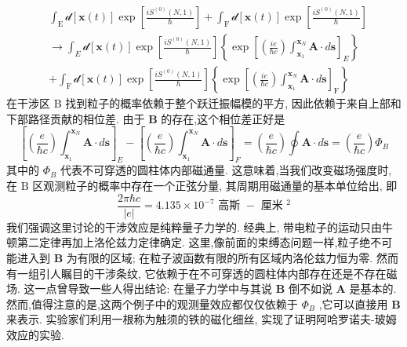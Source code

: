 \documentclass[lang=cn,newtx,10pt,scheme=chinese,thmcnt=section]{elegantbook}
\begin{document}
\begin{equation}
	\begin{aligned}
		&\int_{\mathrm{E}}\mathcal{d}\left\lbrack {\mathbf{x}\left( t\right) }\right\rbrack \exp \left\lbrack \frac{i{S}^{\left( 0\right) }\left( {N,1}\right) }{\hbar }\right\rbrack + \int_{\mathrm{F}}\mathcal{d}\left\lbrack {\mathbf{x}\left( t\right) }\right\rbrack \exp \left\lbrack \frac{i{S}^{\left( 0\right) }\left( {N,1}\right) }{\hbar }\right\rbrack\\
		&\rightarrow \int_{E}\mathcal{d}\left\lbrack {\mathbf{x}\left( t\right) }\right\rbrack \exp \left\lbrack \frac{i{S}^{\left( 0\right) }\left( {N,1}\right) }{\hbar }\right\rbrack \left\{ {\exp {\left\lbrack \left( \frac{ie}{\hbar c}\right) \int_{{\mathbf{x}}_{1}}^{{\mathbf{x}}_{N}}\mathbf{A} \cdot d\mathbf{s}\right\rbrack }_{E}}\right\}\\
		&+ \int_{\mathrm{F}}\mathcal{d}\left\lbrack {\mathbf{x}\left( t\right) }\right\rbrack \exp \left\lbrack \frac{i{S}^{\left( 0\right) }\left( {N,1}\right) }{\hbar }\right\rbrack \left\{ {\exp {\left\lbrack \left( \frac{ie}{\hbar c}\right) \int_{{\mathbf{x}}_{1}}^{{\mathbf{x}}_{N}}\mathbf{A} \cdot d\mathbf{s}\right\rbrack }_{\mathrm{F}}}\right\}
	\end{aligned}
\end{equation}
在干涉区 B 找到粒子的概率依赖于整个跃迁振幅模的平方, 因此依赖于来自上部和下部路径贡献的相位差. 由于 $\mathbf{B}$ 的存在,这个相位差正好是
\begin{equation}
	{\left\lbrack \left( \frac{e}{\hbar c}\right) \int_{{\mathbf{x}}_{1}}^{{\mathbf{x}}_{N}}\mathbf{A} \cdot d\mathbf{s}\right\rbrack }_{E} - {\left\lbrack \left( \frac{e}{\hbar c}\right) \int_{{\mathbf{x}}_{1}}^{{\mathbf{x}}_{N}}\mathbf{A} \cdot d\mathbf{s}\right\rbrack }_{F} = \left( \frac{e}{\hbar c}\right) \oint \mathbf{A} \cdot d\mathbf{s}= \left( \frac{e}{\hbar c}\right) {\Phi }_{B}
\end{equation}
其中的 ${\Phi }_{B}$ 代表不可穿透的圆柱体内部磁通量. 这意味着,当我们改变磁场强度时,在 $\mathrm{B}$ 区观测粒子的概率中存在一个正弦分量, 其周期用磁通量的基本单位给出, 即
\begin{equation}
	\frac{{2\pi }\hbar c}{\left| e\right| } = {4.135} \times {10}^{-7}\text{ 高斯 } - \text{ 厘米 }{}^{2}
\end{equation}
我们强调这里讨论的干涉效应是纯粹量子力学的. 经典上, 带电粒子的运动只由牛顿第二定律再加上洛伦兹力定律确定. 这里,像前面的束缚态问题一样,粒子绝不可能进入到 $\mathbf{B}$ 为有限的区域; 在粒子波函数有限的所有区域内洛伦兹力恒为零. 然而有一组引人瞩目的干涉条纹, 它依赖于在不可穿透的圆柱体内部存在还是不存在磁场. 这一点曾导致一些人得出结论: 在量子力学中与其说 $\mathbf{B}$ 倒不如说 $\mathbf{A}$ 是基本的. 然而,值得注意的是,这两个例子中的观测量效应都仅仅依赖于 ${\Phi }_{B}$ ,它可以直接用 $\mathbf{B}$ 来表示. 实验家们利用一根称为触须的铁的磁化细丝, 实现了证明阿哈罗诺夫-玻姆效应的实验.
\end{document}
